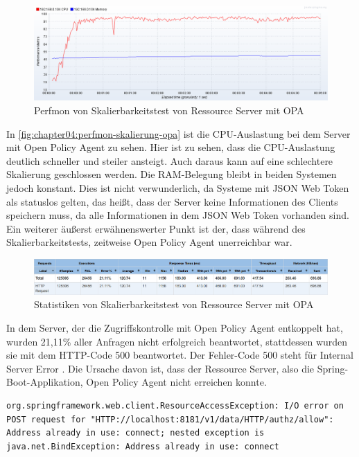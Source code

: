 \begin{figure}[H]
  \centering
  \includegraphics[width=1.0\textwidth]{gfx/perfmon-skalierung-opa.png}
  \caption{Perfmon von Skalierbarkeitstest von Ressource Server mit OPA}
  \label{fig:chapter04:perfmon-skalierung-opa}
\end{figure}

In \autoref{fig:chapter04:perfmon-skalierung-opa} ist die CPU-Auslastung bei dem Server mit Open Policy Agent zu sehen. Hier ist zu sehen, dass die CPU-Auslastung deutlich schneller und steiler ansteigt. Auch daraus kann auf eine schlechtere Skalierung geschlossen werden. 
Die RAM-Belegung bleibt in beiden Systemen jedoch konstant. Dies ist nicht verwunderlich, da Systeme mit JSON Web Token als statuslos gelten, das heißt, dass der Server keine Informationen des Clients speichern muss, da alle Informationen in dem JSON Web Token vorhanden sind. 
Ein weiterer äußerst erwähnenswerter Punkt ist der, dass während des Skalierbarkeitstests, zeitweise Open Policy Agent unerreichbar war. 

\begin{figure}[H]
  \centering
  \includegraphics[width=1.0\textwidth]{gfx/statistik-skalierung-opa.png}
  \caption{Statistiken von Skalierbarkeitstest von Ressource Server mit OPA}
  \label{fig:chapter04:statistik-skalierung-opa}
\end{figure}

In dem Server, der die Zugriffskontrolle mit Open Policy Agent entkoppelt hat, wurden 21,11\% aller Anfragen nicht erfolgreich beantwortet, stattdessen wurden sie mit dem HTTP-Code 500 beantwortet. Der Fehler-Code 500 steht für Internal Server Error \citep{mdnwebdocs:2021}. Die Ursache davon ist, dass der Ressource Server, also die Spring-Boot-Applikation, Open Policy Agent nicht erreichen konnte. 

\begin{lstlisting}[frame=tb,caption={Fehlermeldung Spring-Boot},label=lst:FehlermeldungSpring-Boot]
  org.springframework.web.client.ResourceAccessException: I/O error on POST request for "HTTP://localhost:8181/v1/data/HTTP/authz/allow": Address already in use: connect; nested exception is java.net.BindException: Address already in use: connect
\end{lstlisting}
\bigskip

